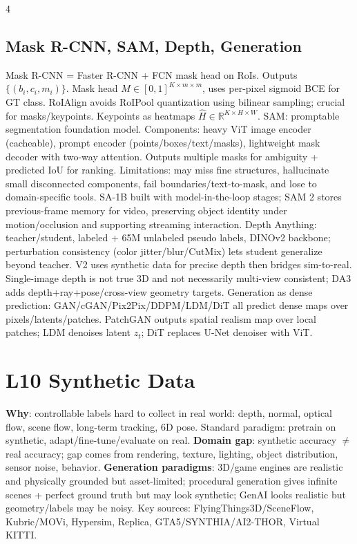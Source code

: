 \documentclass[8pt,a4paper,landscape]{extarticle}
\newcommand{\key}[1]{\textbf{#1}}
\newcommand{\R}{\mathbb{R}}
\begin{document}
\begin{multicols*}{4}
\subsection{Mask R-CNN, SAM, Depth, Generation}
Mask R-CNN = Faster R-CNN + FCN mask head on RoIs. Outputs $\{(b_i,c_i,m_i)\}$. Mask head $M\in[0,1]^{K\times m\times m}$, uses per-pixel sigmoid BCE for GT class. RoIAlign avoids RoIPool quantization using bilinear sampling; crucial for masks/keypoints. Keypoints as heatmaps $\hat H\in\R^{K\times H\times W}$.
SAM: promptable segmentation foundation model. Components: heavy ViT image encoder (cacheable), prompt encoder (points/boxes/text/masks), lightweight mask decoder with two-way attention. Outputs multiple masks for ambiguity + predicted IoU for ranking. Limitations: may miss fine structures, hallucinate small disconnected components, fail boundaries/text-to-mask, and lose to domain-specific tools. SA-1B built with model-in-the-loop stages; SAM 2 stores previous-frame memory for video, preserving object identity under motion/occlusion and supporting streaming interaction.
Depth Anything: teacher/student, labeled + 65M unlabeled pseudo labels, DINOv2 backbone; perturbation consistency (color jitter/blur/CutMix) lets student generalize beyond teacher. V2 uses synthetic data for precise depth then bridges sim-to-real. Single-image depth is not true 3D and not necessarily multi-view consistent; DA3 adds depth+ray+pose/cross-view geometry targets.
Generation as dense prediction: GAN/cGAN/Pix2Pix/DDPM/LDM/DiT all predict dense maps over pixels/latents/patches. PatchGAN outputs spatial realism map over local patches; LDM denoises latent $z_t$; DiT replaces U-Net denoiser with ViT.

\section{L10 Synthetic Data}
\key{Why}: controllable labels hard to collect in real world: depth, normal, optical flow, scene flow, long-term tracking, 6D pose. Standard paradigm: pretrain on synthetic, adapt/fine-tune/evaluate on real. \key{Domain gap}: synthetic accuracy $\ne$ real accuracy; gap comes from rendering, texture, lighting, object distribution, sensor noise, behavior.
\key{Generation paradigms}: 3D/game engines are realistic and physically grounded but asset-limited; procedural generation gives infinite scenes + perfect ground truth but may look synthetic; GenAI looks realistic but geometry/labels may be noisy. Key sources: FlyingThings3D/SceneFlow, Kubric/MOVi, Hypersim, Replica, GTA5/SYNTHIA/AI2-THOR, Virtual KITTI.

\end{multicols*}
\end{document}
